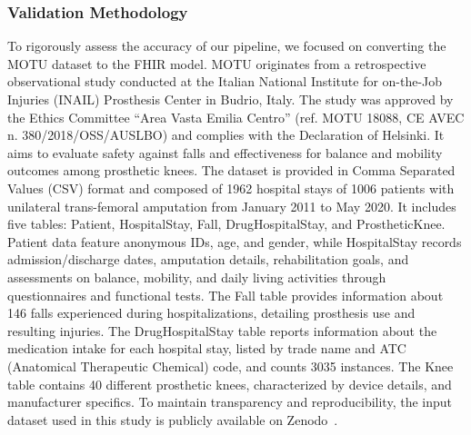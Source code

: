 \subsubsection{Validation Methodology}
To rigorously assess the accuracy of our pipeline, we focused on converting the MOTU dataset to the FHIR model. MOTU originates from a retrospective observational study conducted at the Italian National Institute for on-the-Job Injuries (INAIL) Prosthesis Center in Budrio, Italy. The study was approved by the Ethics Committee “Area Vasta Emilia Centro” (ref. MOTU 18088, CE AVEC n. 380/2018/OSS/AUSLBO) and complies with the Declaration of Helsinki. It aims to evaluate safety against falls and effectiveness for balance and mobility outcomes among prosthetic knees. The dataset is provided in Comma Separated Values (CSV) format and composed of 1962 hospital stays of 1006 patients with unilateral trans-femoral amputation from January 2011 to May 2020. It includes five tables: Patient, HospitalStay, Fall, DrugHospitalStay, and ProstheticKnee. Patient data feature anonymous IDs, age, and gender, while HospitalStay records admission/discharge dates, amputation details, rehabilitation goals, and assessments on balance, mobility, and daily living activities through questionnaires and functional tests. The Fall table provides information about 146 falls experienced during hospitalizations, detailing prosthesis use and resulting injuries. The DrugHospitalStay table reports information about the medication intake for each hospital stay, listed by trade name and ATC (Anatomical Therapeutic Chemical) code, and counts 3035 instances. The Knee table contains 40 different prosthetic knees, characterized by device details, and manufacturer specifics. To maintain transparency and reproducibility, the input dataset used in this study is publicly available on Zenodo~\cite{arcobelli_motu_2024}. 


